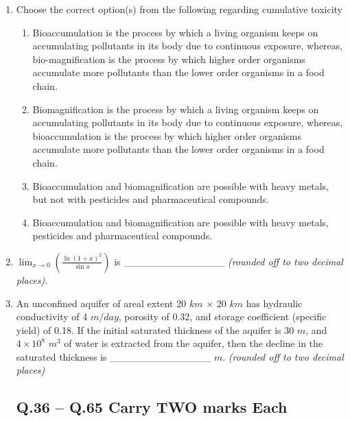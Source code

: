 \documentclass[journal]{IEEEtran}
\begin{document}
\begin{enumerate}[resume]
\item Choose the correct option(s) from the following regarding cumulative toxicity
\hfill{}
\begin{enumerate}
\item Bioaccumulation is the process by which a living organism keeps on accumulating pollutants in its body due to continuous exposure, whereas, bio-magnification is the process by which higher order organisms accumulate more pollutants than the lower order organisms in a food chain.
\item Biomagnification is the process by which a living organism keeps on accumulating pollutants in its body due to continuous exposure, whereas, bioaccumulation is the process by which higher order organisms accumulate more pollutants than the lower order organisms in a food chain.
\item Bioaccumulation and biomagnification are possible with heavy metals, but not with pesticides and pharmaceutical compounds.
\item Bioaccumulation and biomagnification are possible with heavy metals, pesticides and pharmaceutical compounds.
\end{enumerate}

\item $\lim_{x\to0} \left( \frac{\ln(1+x)^2}{\sin x} \right)$ is \_\_\_\_\_\_\_\_\_\_\_\_\_\_ \textit{(rounded off to two decimal places)}.
\hfill{}

\item An unconfined aquifer of areal extent 20 $km$ $\times$ 20 $km$ has hydraulic conductivity of 4 $m/day$, porosity of 0.32, and storage coefficient (specific yield) of 0.18. If the initial saturated thickness of the aquifer is 30 $m$, and $4 \times 10^8$ $m^3$ of water is extracted from the aquifer, then the decline in the saturated thickness is \_\_\_\_\_\_\_\_\_\_\_\_\_\_ $m$. \textit{(rounded off to two decimal places)}
\hfill{}

\subsection*{Q.36 -- Q.65 Carry TWO marks Each}


\end{enumerate}
\end{document}
